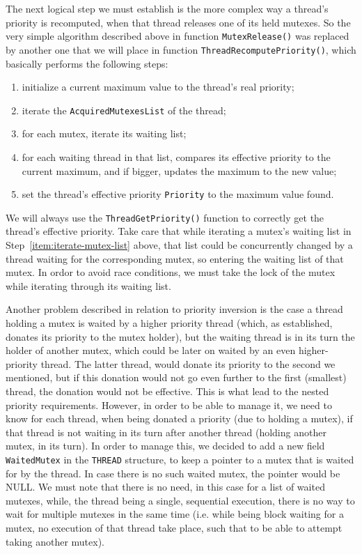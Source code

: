 The next logical step we must establish is the more complex way a thread's priority is recomputed, when that thread releases one of its held mutexes. So the very simple algorithm described above in function \lstinline|MutexRelease()| was replaced by another one that we will place in function \lstinline|ThreadRecomputePriority()|, which basically performs the following steps:
\begin{enumerate}
    \item initialize a current maximum value to the thread's real priority;
    \item iterate the \lstinline|AcquiredMutexesList| of the thread;
    \item \label{item:iterate-mutex-list} for each mutex, iterate its waiting list;
    \item for each waiting thread in that list, compares its effective priority to the current maximum, and if bigger, updates the maximum to the new value;
    \item set the thread's effective priority \lstinline|Priority| to the maximum value found.
\end{enumerate}

We will always use the \lstinline|ThreadGetPriority()| function to correctly get the thread's effective priority. Take care that while iterating a mutex's waiting list in Step~\ref{item:iterate-mutex-list} above, that list could be concurrently changed by a thread waiting for the corresponding mutex, so entering the waiting list of that mutex. In ordor to avoid race conditions, we must take the lock of the mutex while iterating through its waiting list. 


Another problem described in relation to priority inversion is the case a thread holding a mutex is waited by a higher priority thread (which, as established, donates its priority to the mutex holder), but the waiting thread is in its turn the holder of another mutex, which could be later on waited by an even higher-priority thread. The latter thread, would donate its priority to the second we mentioned, but if this donation would not go even further to the first (smallest) thread, the donation would not be effective. This is what lead to the nested priority requirements. However, in order to be able to manage it, we need to know for each thread, when being donated a priority (due to holding a mutex), if that thread is not waiting in its turn after another thread (holding another mutex, in its turn). In order to manage this, we decided to add a new field \lstinline|WaitedMutex| in the \lstinline|THREAD| structure, to keep a pointer to a mutex that is waited for by the thread. In case there is no such waited mutex, the pointer would be NULL. We must note that there is no need, in this case for a list of waited mutexes, while, the thread being a single, sequential execution, there is no way to wait for multiple mutexes in the same time (i.e. while being block waiting for a mutex, no execution of that thread take place, such that to be able to attempt taking another mutex). 

